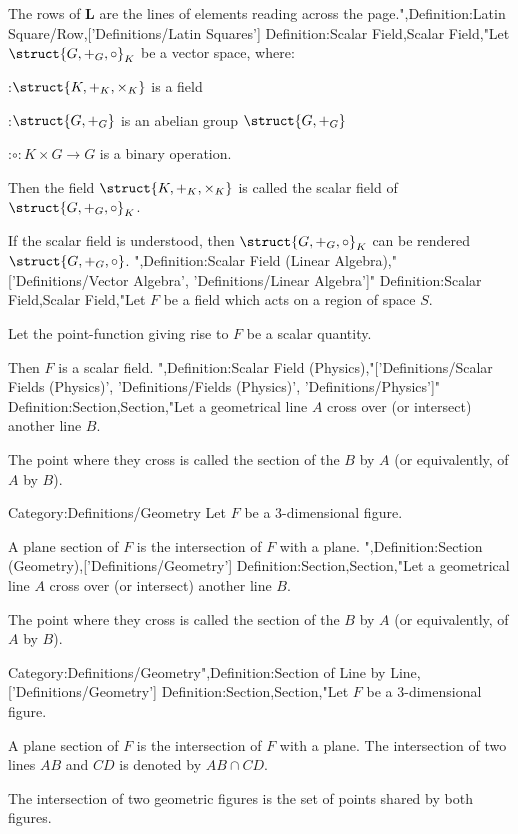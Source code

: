 The rows of $\mathbf L$ are the lines of elements reading across the page.",Definition:Latin Square/Row,['Definitions/Latin Squares']
Definition:Scalar Field,Scalar Field,"Let $\struct {G, +_G, \circ}_K$ be a vector space, where:

:$\struct {K, +_K, \times_K}$ is a field

:$\struct {G, +_G}$ is an abelian group $\struct {G, +_G}$

:$\circ: K \times G \to G$ is a binary operation.


Then the field $\struct {K, +_K, \times_K}$ is called the scalar field of $\struct {G, +_G, \circ}_K$.


If the scalar field is understood, then $\struct {G, +_G, \circ}_K$ can be rendered $\struct {G, +_G, \circ}$.
",Definition:Scalar Field (Linear Algebra),"['Definitions/Vector Algebra', 'Definitions/Linear Algebra']"
Definition:Scalar Field,Scalar Field,"Let $F$ be a field which acts on a region of space $S$.

Let the point-function giving rise to $F$ be a scalar quantity.


Then $F$ is a scalar field.
",Definition:Scalar Field (Physics),"['Definitions/Scalar Fields (Physics)', 'Definitions/Fields (Physics)', 'Definitions/Physics']"
Definition:Section,Section,"Let a geometrical line $A$ cross over (or intersect) another line $B$.

The point where they cross is called the section of the $B$ by $A$ (or equivalently, of $A$ by $B$).


Category:Definitions/Geometry
Let $F$ be a $3$-dimensional figure.

A plane section of $F$ is the intersection of $F$ with a plane.
",Definition:Section (Geometry),['Definitions/Geometry']
Definition:Section,Section,"Let a geometrical line $A$ cross over (or intersect) another line $B$.

The point where they cross is called the section of the $B$ by $A$ (or equivalently, of $A$ by $B$).


Category:Definitions/Geometry",Definition:Section of Line by Line,['Definitions/Geometry']
Definition:Section,Section,"Let $F$ be a $3$-dimensional figure.

A plane section of $F$ is the intersection of $F$ with a plane.
The intersection of two lines $AB$ and $CD$ is denoted by $AB \cap CD$.

The intersection of two geometric figures is the set of points shared by both figures.


